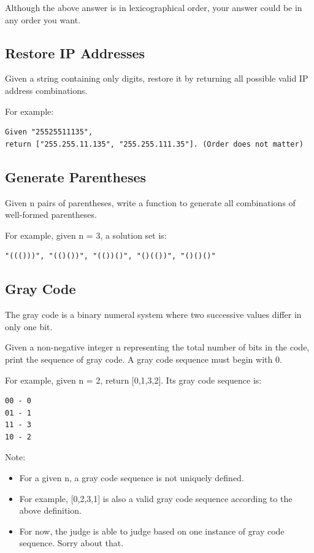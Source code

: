 \documentclass[12pt]{book}
\begin{document}
Although the above answer is in lexicographical order, your answer could be in any order you want.
\subsection{Restore IP Addresses}
\label{sec-16-4-2}
Given a string containing only digits, restore it by returning all possible valid IP address combinations.

For example:
\lstset{language=java,label= ,caption= ,numbers=none}
\begin{lstlisting}
Given "25525511135",
return ["255.255.11.135", "255.255.111.35"]. (Order does not matter)
\end{lstlisting}
\subsection{Generate Parentheses}
\label{sec-16-4-3}
Given n pairs of parentheses, write a function to generate all combinations of well-formed parentheses.

For example, given n = 3, a solution set is:
\lstset{language=java,label= ,caption= ,numbers=none}
\begin{lstlisting}
"((()))", "(()())", "(())()", "()(())", "()()()"
\end{lstlisting}
\subsection{Gray Code}
\label{sec-16-4-4}
The gray code is a binary numeral system where two successive values differ in only one bit.

Given a non-negative integer n representing the total number of bits in the code, print the sequence of gray code. A gray code sequence must begin with 0.

For example, given n = 2, return [0,1,3,2]. Its gray code sequence is:
\lstset{language=java,label= ,caption= ,numbers=none}
\begin{lstlisting}
00 - 0
01 - 1
11 - 3
10 - 2
\end{lstlisting}
Note:
\begin{itemize}
\item For a given n, a gray code sequence is not uniquely defined.
\item For example, [0,2,3,1] is also a valid gray code sequence according to the above definition.
\item For now, the judge is able to judge based on one instance of gray code sequence. Sorry about that.
\end{itemize}
\end{document}
